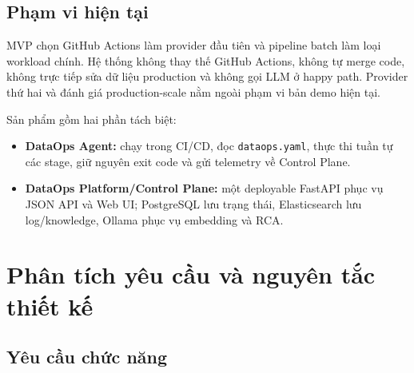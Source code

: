 \documentclass[12pt,a4paper,oneside]{report}
\newcommand{\code}[1]{\texttt{#1}}
\begin{document}
\section{Phạm vi hiện tại}

MVP chọn GitHub Actions làm provider đầu tiên và pipeline batch làm loại workload chính. Hệ thống
không thay thế GitHub Actions, không tự merge code, không trực tiếp sửa dữ liệu production và
không gọi LLM ở happy path. Provider thứ hai và đánh giá production-scale nằm ngoài phạm vi bản
demo hiện tại.

Sản phẩm gồm hai phần tách biệt:

\begin{itemize}
  \item \textbf{DataOps Agent:} chạy trong CI/CD, đọc \code{dataops.yaml}, thực thi tuần tự các
  stage, giữ nguyên exit code và gửi telemetry về Control Plane.
  \item \textbf{DataOps Platform/Control Plane:} một deployable FastAPI phục vụ JSON API và Web
  UI; PostgreSQL lưu trạng thái, Elasticsearch lưu log/knowledge, Ollama phục vụ embedding và RCA.
\end{itemize}

\chapter{Phân tích yêu cầu và nguyên tắc thiết kế}

\section{Yêu cầu chức năng}
\end{document}
